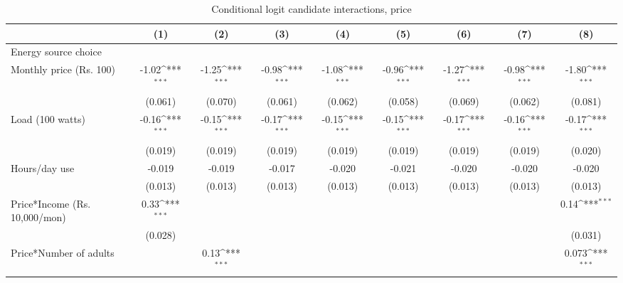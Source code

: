 \begin{table}[htbp]\centering
\def\sym#1{\ifmmode^{#1}\else\(^{#1}\)\fi}
\caption{Conditional logit candidate interactions, price}
\begin{tabular*}{1\hsize}{@{\hskip\tabcolsep\extracolsep\fill}l*{8}{c}}
\toprule
                &\multicolumn{1}{c}{(1)}         &\multicolumn{1}{c}{(2)}         &\multicolumn{1}{c}{(3)}         &\multicolumn{1}{c}{(4)}         &\multicolumn{1}{c}{(5)}         &\multicolumn{1}{c}{(6)}         &\multicolumn{1}{c}{(7)}         &\multicolumn{1}{c}{(8)}         \\
\midrule
Energy source choice&                  &                  &                  &                  &                  &                  &                  &                  \\
Monthly price (Rs. 100)&    -1.02\sym{***}&    -1.25\sym{***}&    -0.98\sym{***}&    -1.08\sym{***}&    -0.96\sym{***}&    -1.27\sym{***}&    -0.98\sym{***}&    -1.80\sym{***}\\
                &  (0.061)         &  (0.070)         &  (0.061)         &  (0.062)         &  (0.058)         &  (0.069)         &  (0.062)         &  (0.081)         \\
Load (100 watts)&    -0.16\sym{***}&    -0.15\sym{***}&    -0.17\sym{***}&    -0.15\sym{***}&    -0.15\sym{***}&    -0.17\sym{***}&    -0.16\sym{***}&    -0.17\sym{***}\\
                &  (0.019)         &  (0.019)         &  (0.019)         &  (0.019)         &  (0.019)         &  (0.019)         &  (0.019)         &  (0.020)         \\
Hours/day use   &   -0.019         &   -0.019         &   -0.017         &   -0.020         &   -0.021         &   -0.020         &   -0.020         &   -0.020         \\
                &  (0.013)         &  (0.013)         &  (0.013)         &  (0.013)         &  (0.013)         &  (0.013)         &  (0.013)         &  (0.013)         \\
Price*Income (Rs. 10,000/mon)&     0.33\sym{***}&                  &                  &                  &                  &                  &                  &     0.14\sym{***}\\
                &  (0.028)         &                  &                  &                  &                  &                  &                  &  (0.031)         \\
Price*Number of adults&                  &     0.13\sym{***}&                  &                  &                  &                  &                  &    0.073\sym{***}\\

\end{tabular*}
\end{table}
